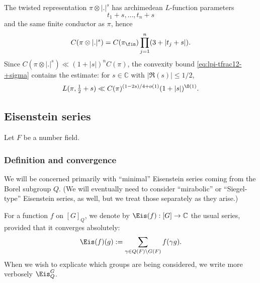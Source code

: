 The twisted representation $\pi \otimes |.|^s$ has archimedean $L$-function parameters
\begin{equation*}
  t_1+s,\dotsc,t_n+s
\end{equation*}
and the same finite conductor as $\pi$, hence
\begin{equation*}
  C(\pi \otimes |.|^s) = C(\pi_{\fin}) \prod_{j=1}^n (3 + |t_j + s|).
\end{equation*}
Since $C(\pi \otimes |.|^s) \ll (1 + |s|)^{n} C(\pi)$, the convexity bound \eqref{eq:lpi-tfrac12-+sigma} contains the estimate: for $s \in \mathbb{C}$ with  $|\Re(s)| \leq 1/2$,
\begin{equation}\label{eqn:convexity-polynomially-in-s}
  L(\pi, \tfrac{1}{2} +s)
  \ll
  C(\pi)^{(1 - 2 s)/4 + o(1)}
  (1 + |s|)^{\O(1)}.
\end{equation}









\subsection{Eisenstein series}\label{sec:eisenstein-series}
Let $F$ be a number field.

\subsubsection{Definition and convergence}\label{sec:cuhjp7akc2}
We will be concerned primarily with ``minimal'' Eisenstein series coming from the Borel subgroup $Q$.  (We will eventually need to consider ``mirabolic'' or ``Siegel-type'' Eisenstein series, as well, but we treat those separately as they arise.)

For a function $f$ on $[G]_Q$, we denote by $\Eis(f) : [G] \rightarrow \mathbb{C}$ the usual series, provided that it converges absolutely:
\begin{equation*}
  \Eis(f)(g) := \sum_{\gamma \in Q(F) \backslash G(F)} f(\gamma g).
\end{equation*}
When we wish to explicate which groups are being considered, we write more verbosely $\Eis_Q^G$. 


